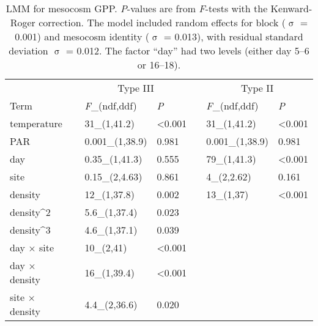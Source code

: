 \documentclass[12pt]{article}
\begin{document}
\begin{table}
\caption{\label{tab:gpp}
LMM for mesocosm GPP. 
\textit{P}-values are from \textit{F}-tests with the Kenward-Roger correction.
The model included random effects for block ($\upsigma$ = 0.001)
and mesocosm identity ($\upsigma$ = 0.013), 
with residual standard deviation $\upsigma$ = 0.012.
The factor ``day'' had two levels (either day 5--6 or 16--18).}
\setlength{\tabcolsep}{12pt}
\begin{tabular}{lllllll}
\toprule
& & \multicolumn{2}{c}{Type III} & & \multicolumn{2}{c}{Type II} \\
\cmidrule{3-4} \cmidrule{6-7}
Term & & \textit{F}_{(ndf,ddf)} & \textit{P} & & \textit{F}_{(ndf,ddf)} & \textit{P}\\
\midrule
temperature & & 31_{(1,41.2)} & <0.001 & & 31_{(1,41.2)} & <0.001\\

PAR & & 0.001_{(1,38.9)} & 0.981 & & 0.001_{(1,38.9)} & 0.981\\

day & & 0.35_{(1,41.3)} & 0.555 & & 79_{(1,41.3)} & <0.001\\

site & & 0.15_{(2,4.63)} & 0.861 & & 4_{(2,2.62)} & 0.161\\

density & & 12_{(1,37.8)} & 0.002 & & 13_{(1,37)} & <0.001\\

density^2 & & 5.6_{(1,37.4)} & 0.023 & &  & \\

density^3  & & 4.6_{(1,37.1)} & 0.039 & & & \\

day $\times$ site & & 10_{(2,41)} & <0.001 & & & \\

day $\times$ density & & 16_{(1,39.4)} & <0.001 & & & \\

site $\times$ density & & 4.4_{(2,36.6)} & 0.020 & & & \\
\bottomrule
\end{tabular}
\end{table}


\clearpage


\end{document}
